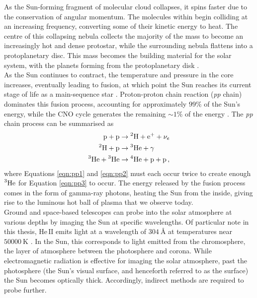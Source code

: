 \documentclass[11pt,a4paper,onecolumn]{report}
\newcommand*\chem[1]{\ensuremath{\mathrm{#1}}}
\begin{document}
As the Sun-forming fragment of molecular cloud collapses, it spins faster due to
the conservation of angular momentum. The molecules within begin colliding at an
increasing frequency, converting some of their kinetic energy to heat. The
centre of this collapsing nebula collects the majority of the mass to become an
increasingly hot and dense protostar, while the surrounding nebula flattens into
a protoplanetary disc. This mass becomes the building material for the solar
system, with the planets forming from the protoplanetary disk
\citep{greaves_disks_2005}. \\

As the Sun continues to contract, the temperature and pressure in the core
increases, eventually leading to fusion, at which point the Sun reaches its
current stage of life as a main-sequence star \citep{woolfson_origin_2000}.
Proton-proton chain reaction (\textit{pp} chain) dominates this fusion process,
accounting for approximately $99\%$ of the Sun's energy, while the CNO cycle
generates the remaining \(\sim 1\%\) of the energy \citep{adelberger_solar_2011}.
The \textit{pp} chain process can be summarised as
\begin{align}
  \chem{p} + \chem{p} &\rightarrow \chem{\prescript{2}{}H} + \chem{e^+} +
  \nu_e \label{eqn:pp1}\\
  \chem{\prescript{2}{}H} + \chem{p} &\rightarrow \chem{\prescript{3}{}He}
  + \gamma \label{eqn:pp2}\\
  \chem{\prescript{3}{}He} + \chem{\prescript{3}{}He} & \rightarrow
  \chem{\prescript{4}{}He} + \chem{p} + \chem{p}\,, \label{eqn:pp3}
\end{align}
where Equations \ref{eqn:pp1} and \ref{eqn:pp2} must each occur twice to create
enough $\chem{\prescript{3}{}He}$ for Equation \ref{eqn:pp3} to occur. The
energy released by the fusion process comes in the form of gamma-ray photons,
heating the Sun from the inside, giving rise to the luminous hot ball of plasma
that we observe today. \\


Ground and space-based telescopes can probe into the solar atmosphere at various
depths by imaging the Sun at specific wavelengths. Of particular note in this
thesis, \(\chem{He \, II}\) emits light at a wavelength of
\(\SI{304}{\angstrom}\) at temperatures near \(\SI{50000}{\kelvin}\)
\citep{herbert_friedman_solar_1962}. In the Sun, this corresponds to light
emitted from the chromosphere, the layer of atmosphere between the photosphere
and corona. While electromagnetic radiation is effective for imaging the solar
atmosphere, past the photosphere (the Sun's visual surface, and henceforth
referred to as the surface) the Sun becomes optically thick. Accordingly,
indirect methods are required to probe further.\\
\end{document}
